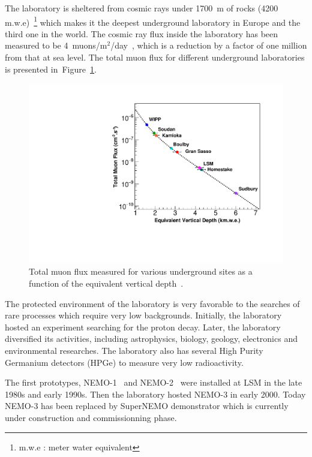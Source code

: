 \documentclass[main.tex]{subfiles}
\begin{document}
\NI The laboratory is sheltered from cosmic rays under 1700~m of rocks (4200 m.w.e)~\footnote{m.w.e : meter water equivalent} which makes it the deepest underground laboratory in Europe and the third one in the world. The cosmic ray flux inside the laboratory has been measured to be 4~muons/m$^\text{2}$/day~\cite{CosmicFluxLSM}, which is a reduction by a factor of one million from that at sea level. The total muon flux for different underground laboratories is presented in~Figure~\ref{LabDeepth}.
 

\begin{figure}[h!]
\begin{center}
\includegraphics[scale=0.60]{pictures/Chap3/MuonFluxDifferentLab.pdf}
\caption{Total muon flux measured for various underground sites as a function of the equivalent vertical depth~\cite{MuonFluxUndergroundLab}. }
\label{LabDeepth}
\end{center}
\end{figure}


\NI The protected environment of the laboratory is very favorable to the searches of rare processes which require very low backgrounds. Initially, the laboratory hosted an experiment searching for the proton decay. Later, the laboratory diversified its activities, including astrophysics, biology, geology, electronics and environmental researches. The laboratory also has several High Purity Germanium detectors (HPGe) to measure very low radioactivity. 


\bigskip


\NI The first prototypes, NEMO-1~\cite{NEMO1} and NEMO-2~\cite{NEMO2} were installed at LSM in the late 1980s and early 1990s. Then the laboratory hosted NEMO-3 in early 2000. Today NEMO-3 has been replaced by SuperNEMO demonstrator which is currently under construction and commissionning phase.
\end{document}
